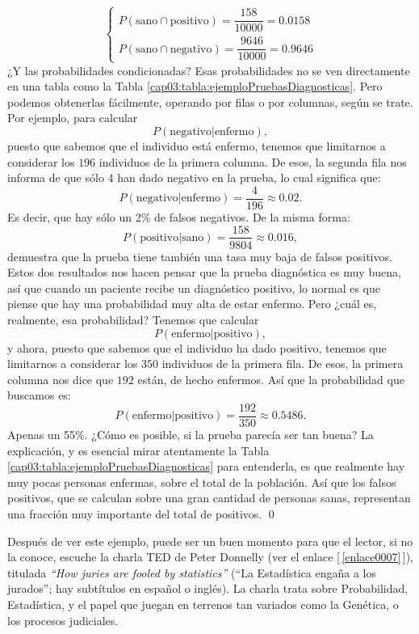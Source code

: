 \begin{ejemplo}
\[\begin{cases}
        P\left(\mbox{sano}\cap\mbox{positivo}\right)=\dfrac{158}{10000}=0.0158\\[5mm]
        P\left(\mbox{sano}\cap\mbox{negativo}\right)=\dfrac{9646}{10000}=0.9646
        \end{cases}
        \]
        ¿Y las probabilidades condicionadas? Esas probabilidades no se ven directamente en una tabla como la Tabla \ref{cap03:tabla:ejemploPruebasDiagnosticas}. Pero podemos obtenerlas fácilmente, operando por filas o por columnas, según se trate. Por ejemplo, para calcular
        \[P\left(\mbox{negativo} | \mbox{enfermo} \right),\]
        puesto que sabemos que el individuo está enfermo, tenemos que limitarnos a considerar los $196$ individuos de la primera columna. De esos, la segunda fila nos informa de que sólo $4$ han dado negativo en la prueba, lo cual significa que:
        \[P\left(\mbox{negativo} | \mbox{enfermo} \right)=\dfrac{4}{196}\approx 0.02.\]
        Es decir, que hay sólo un 2\% de falsos negativos. De la misma forma:
        \[P\left(\mbox{positivo} | \mbox{sano} \right)=\dfrac{158}{9804}\approx 0.016,\]
        demuestra que la prueba tiene también una tasa muy baja de falsos positivos. Estos dos resultados nos hacen pensar que la prueba diagnóstica es muy buena, así que cuando un paciente recibe un diagnóstico positivo, lo normal es que piense que hay una probabilidad muy alta de estar enfermo. Pero ¿cuál es, realmente, esa probabilidad? Tenemos que calcular
        \[P\left(\mbox{enfermo} | \mbox{positivo}\right),\]
        y ahora, puesto que sabemos que el individuo ha dado positivo, tenemos que limitarnos a considerar los $350$ individuos de la primera fila. De esos, la primera columna nos dice que $192$ están, de hecho enfermos. Así que la probabilidad que buscamos es:
        \[P\left(\mbox{enfermo} | \mbox{positivo}\right)=\dfrac{192}{350}\approx 0.5486.\]
        Apenas un 55\%. ¿Cómo es posible, si la prueba parecía ser tan buena? La explicación, y es esencial mirar atentamente la Tabla \ref{cap03:tabla:ejemploPruebasDiagnosticas} para entenderla, es que realmente hay muy pocas personas enfermas, sobre el total de la población. Así que los falsos positivos, que se calculan sobre una gran cantidad de personas sanas, representan una fracción muy importante del total de positivos.
        \qed
      \end{ejemplo}
      Después de ver este ejemplo,  puede ser un buen momento para que el lector, si no la conoce, escuche la charla TED de Peter Donnelly (ver el enlace [\,\ref{enlace0007}\,]\label{enlace0007a}), titulada {\em ``How juries are fooled by statistics''} (``La Estadística engaña a los jurados''; hay subtítulos en español o inglés). La charla trata sobre Probabilidad, Estadística, y el papel que juegan en terrenos tan variados como la Genética, o los procesos judiciales.

